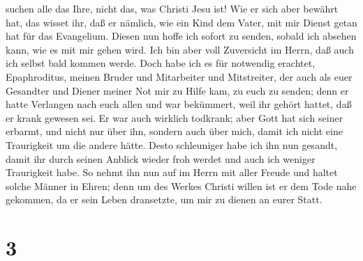 suchen alle das Ihre, nicht das, was Christi Jesu ist! 
Wie er sich aber bewährt hat, das wisset ihr, daß er nämlich, wie ein
Kind dem Vater, mit mir Dienst getan hat für das Evangelium.
 Diesen nun hoffe ich sofort zu senden, sobald ich
absehen kann, wie es mit mir gehen wird.  Ich bin aber
voll Zuversicht im Herrn, daß auch ich selbst bald kommen werde.
 Doch habe ich es für notwendig erachtet, Epaphroditus,
meinen Bruder und Mitarbeiter und Mitstreiter, der auch als euer
Gesandter und Diener meiner Not mir zu Hilfe kam, zu euch zu senden;
 denn er hatte Verlangen nach euch allen und war
bekümmert, weil ihr gehört hattet, daß er krank gewesen sei.
 Er war auch wirklich todkrank; aber Gott hat sich seiner
erbarmt, und nicht nur über ihn, sondern auch über mich, damit ich nicht
eine Traurigkeit um die andere hätte.  Desto schleuniger
habe ich ihn nun gesandt, damit ihr durch seinen Anblick wieder froh
werdet und auch ich weniger Traurigkeit habe.  So nehmt
ihn nun auf im Herrn mit aller Freude und haltet solche Männer in Ehren;
 denn um des Werkes Christi willen ist er dem Tode nahe
gekommen, da er sein Leben dransetzte, um mir zu dienen an eurer Statt.

\hypertarget{section-2}{%
\section{3}\label{section-2}}

